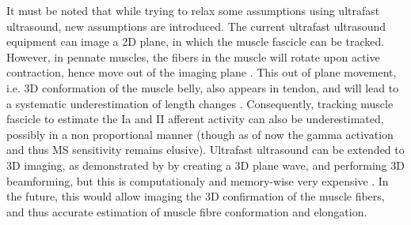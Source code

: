 It must be noted that while trying to relax some assumptions using ultrafast ultrasound, new assumptions are introduced. The current ultrafast ultrasound equipment can image a 2D plane, in which the muscle fascicle can be tracked. However, in pennate muscles, the fibers in the muscle will rotate upon active contraction, hence move out of the imaging plane \cite{finni_structural_2006}. This out of plane movement, i.e. 3D conformation of the muscle belly, also appears in tendon, and will lead to a systematic underestimation of length changes \cite{seynnes_ultrasound-based_2014}. Consequently, tracking muscle fascicle to estimate the Ia and II afferent activity can also be underestimated, possibly in a non proportional manner (though as of now the gamma activation and thus MS sensitivity remains elusive). Ultrafast ultrasound can be extended to 3D imaging, as demonstrated by \citeauthor{provost_3d_2014} by creating a 3D plane wave, and performing 3D beamforming, but this is computationaly and memory-wise very expensive \cite{provost_3d_2014}. In the future, this would allow imaging the 3D confirmation of the muscle fibers, and thus accurate estimation of muscle fibre conformation and elongation. 







